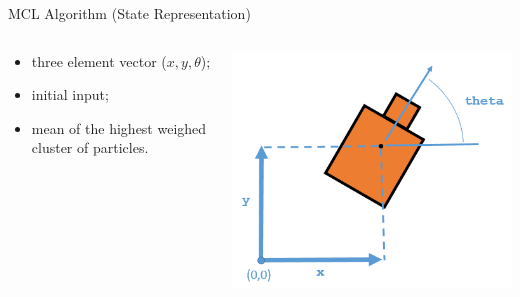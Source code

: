 \begin{frame}{MCL Algorithm (State Representation)}
    
    \begin{columns}
        \begin{column}{0.55\textwidth}
            \begin{itemize}
                \item three element vector (\(x, y, \theta\));
                \item initial input;
                \item mean of the highest weighed cluster of particles.
            \end{itemize}
        \end{column}
        \hfill
        \begin{column}{0.35\textwidth}
            \includegraphics[width=\columnwidth]{figures/robot_pose.png}
        \end{column}
    \end{columns}

\end{frame}


